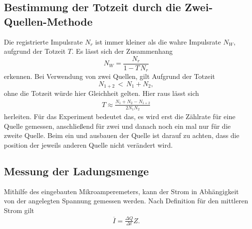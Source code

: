 \subsection{Bestimmung der Totzeit durch die Zwei-Quellen-Methode}
Die registrierte Impulsrate $N_r$ ist immer kleiner als die wahre Impulsrate $N_W$, aufgrund der Totzeit $T$. Es lässt sich der Zusammenhang
$$
N_W=\frac{N_r}{1-T \, N_r}
$$
erkennen. Bei Verwendung von zwei Quellen, gilt Aufgrund der Totzeit 
$$
N_{1+2}\, <\, N_1+N_2,
$$
ohne die Totzeit würde hier Gleichheit gelten. Hier raus lässt sich
\begin{align}
\label{eq:Theorie_Totzeit}
T\approx\frac{N_1+N_2-N_{1+2}}{2N_1N_2}
\end{align}
herleiten. Für das Experiment bedeutet das, es wird erst die Zählrate für eine Quelle gemessen, anschließend für zwei und danach noch ein mal nur für die zweite Quelle. Beim ein und ausbauen der Quelle ist darauf zu achten, dass die position der jeweils anderen Quelle nicht verändert wird.
\subsection{Messung der Ladungsmenge}
Mithilfe des eingebauten Mikroamperemeters, kann der Strom in Abhängigkeit von der angelegten Spannung gemessen werden. Nach Definition für den mittleren Strom gilt
\begin{align}
\label{eq:Theorie_Ladungsmenge}
\overline{I}=\frac{\Delta Q}{\Delta t}Z.
\end{align}